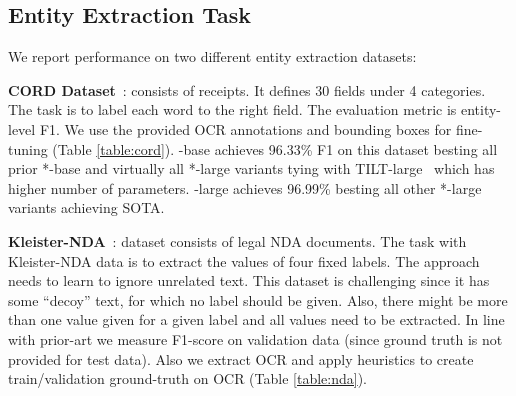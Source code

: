 \vspace{-1em}
\subsection{Entity Extraction Task}
We report performance on two different entity extraction datasets: 

\textbf{CORD Dataset}~\cite{park2019cord}: consists of receipts. It defines 30 fields under 4 categories. The task is to label each word to the right field. The evaluation metric is entity-level F1. We use the provided OCR annotations and bounding boxes for fine-tuning (Table \ref{table:cord}). \papertitle-base achieves 96.33\% F1 on this dataset besting all prior *-base and virtually all *-large variants tying with TILT-large~\cite{powalski2021going} which has higher number of parameters. \papertitle-large achieves 96.99\% besting all other *-large variants achieving SOTA.

\textbf{Kleister-NDA}~\cite{gralinski2020kleister}: dataset consists of legal NDA documents. The task with Kleister-NDA data is to extract the values of four fixed labels. The approach needs to learn to ignore unrelated text. This dataset is challenging since it has some “decoy” text, for which no label should be given. Also, there might be more than one value given for a given label and all values need to be extracted. In line with prior-art we measure F1-score on validation data (since ground truth is not provided for test data). Also we extract OCR and apply heuristics to create train/validation ground-truth on OCR (Table \ref{table:nda}).

